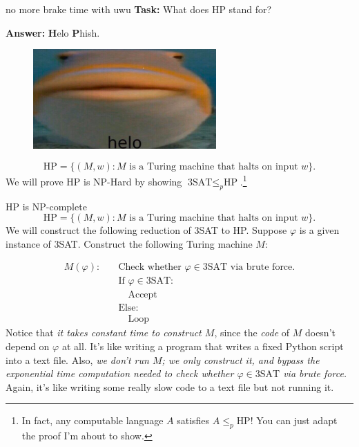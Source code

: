\documentclass{beamer}
\begin{document}
\begin{frame}{no more brake time with uwu}
\textbf{Task:} What does HP stand for?

\textbf{Answer:} \textbf{H}elo \textbf{P}hish.
\begin{figure}[h]
\centering
\includegraphics[width=7cm]{img/helo_fish.jpg}
\end{figure}
$$\text{HP} = \{(M, w): \text{$M$ is a Turing machine that halts on input $w$}\}.$$
We will prove HP is NP-Hard by showing $\text{3SAT} \leq_p \text{HP}$.\footnote{In fact, any computable language $A$ satisfies $A \leq_p \text{HP}$! You can just adapt the proof I'm about to show.}
\end{frame}

\begin{frame}{HP is NP-complete}
$$\text{HP} = \{(M, w): \text{$M$ is a Turing machine that halts on input $w$}\}.$$
We will construct the following reduction of 3SAT to HP. Suppose $\varphi$ is a given instance of 3SAT. Construct the following Turing machine $M$:

\begin{align*}
M(\varphi): \quad &\text{Check whether $\varphi \in \text{3SAT}$ via brute force.}\\
&\text{If $\varphi \in \text{3SAT}$:}\\
&\quad \text{Accept}\\
&\text{Else:}\\
&\quad \text{Loop}
\end{align*}
Notice that \textit{it takes constant time to construct $M$}, since the \textit{code} of $M$ doesn't depend on $\varphi$ at all. It's like writing a program that writes a fixed Python script into a text file. Also, \textit{we don't run $M$; we only construct it, and bypass the exponential time computation needed to check whether $\varphi \in \text{3SAT}$ via brute force.} Again, it's like writing some really slow code to a text file but not running it.

\end{frame}
\end{document}
